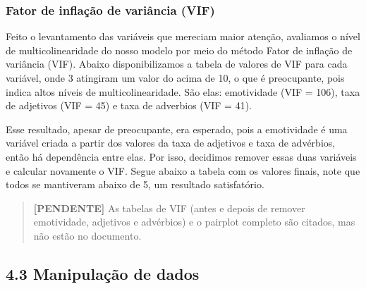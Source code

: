 \documentclass[
  brazilian,
  11pt,
]{article}
\begin{document}
\subsubsection{Fator de inflação de variância (VIF)}\label{fator-de-inflauxe7uxe3o-de-variuxe2ncia-vif}

Feito o levantamento das variáveis que mereciam maior atenção, avaliamos o nível de multicolinearidade do nosso modelo por meio do método Fator de inflação de variância (VIF). Abaixo disponibilizamos a tabela de valores de VIF para cada variável, onde 3 atingiram um valor do acima de 10, o que é preocupante, pois indica altos níveis de multicolinearidade. São elas: emotividade (VIF = 106), taxa de adjetivos (VIF = 45) e taxa de adverbios (VIF = 41).

Esse resultado, apesar de preocupante, era esperado, pois a emotividade é uma variável criada a partir dos valores da taxa de adjetivos e taxa de advérbios, então há dependência entre elas. Por isso, decidimos remover essas duas variáveis e calcular novamente o VIF. Segue abaixo a tabela com os valores finais, note que todos se mantiveram abaixo de 5, um resultado satisfatório.

\begin{quote}
\textbf{{[}PENDENTE{]}} As tabelas de VIF (antes e depois de remover emotividade, adjetivos e advérbios) e o pairplot completo são citados, mas não estão no documento.
\end{quote}

\subsection{4.3 Manipulação de dados}\label{manipulauxe7uxe3o-de-dados}
\end{document}
